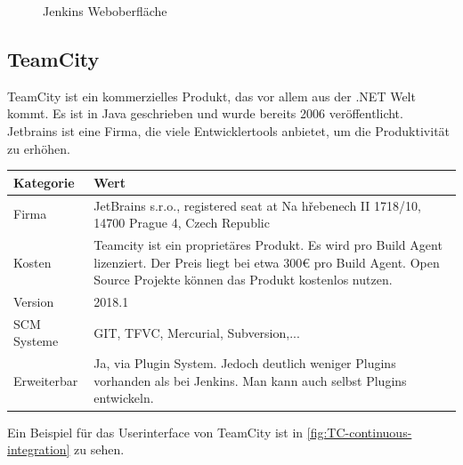 \begin{figure}[H]
  \centering
  \caption{Jenkins Weboberfläche \cite{Jenkins-Example}}\label{fig:Jenkins-sample}
\end{figure}
\subsection{TeamCity}
TeamCity ist ein kommerzielles Produkt, das vor allem aus der .NET Welt kommt. Es ist in Java geschrieben und wurde bereits 2006 veröffentlicht. Jetbrains ist eine Firma, die viele Entwicklertools anbietet, um die Produktivität zu erhöhen. 
\begin{center}
  \begin{tabularx}{\textwidth}{lX}
    \toprule
    Kategorie & Wert \\
    \midrule
    Firma &  JetBrains s.r.o., registered seat at Na hřebenech II 1718/10, 14700 Prague 4, Czech Republic \\
		\addlinespace
    Kosten & Teamcity ist ein proprietäres Produkt. Es wird pro Build Agent lizenziert. Der Preis liegt bei etwa 300€ pro Build Agent. Open Source Projekte können das Produkt kostenlos nutzen.\\
		\addlinespace
		Version & 2018.1 \\
		\addlinespace
		SCM Systeme & GIT, TFVC, Mercurial, Subversion,...\\
		\addlinespace
		Erweiterbar & Ja, via Plugin System. Jedoch deutlich weniger Plugins vorhanden als bei Jenkins. Man kann auch selbst Plugins entwickeln.\\
    \bottomrule
  \end{tabularx}
\end{center}
Ein Beispiel für das Userinterface von TeamCity ist in \autoref{fig:TC-continuous-integration} zu sehen. 

